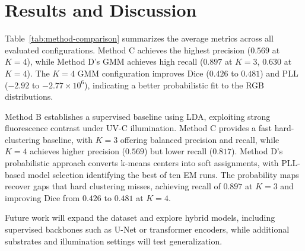 \section{Results and Discussion}

Table~\ref{tab:method-comparison} summarizes the average metrics across all evaluated configurations. Method C achieves the highest precision (\(0.569\) at \(K=4\)), while Method D's GMM achieves high recall (\(0.897\) at \(K=3\), \(0.630\) at \(K=4\)). The \(K=4\) GMM configuration improves Dice (\(0.426\) to \(0.481\)) and PLL (\(-2.92\) to \(-2.77 \times 10^6\)), indicating a better probabilistic fit to the RGB distributions.

\begin{table}[t]
  \centering
  \caption{Cross-method comparison of segmentation metrics.}
  \label{tab:method-comparison}
\end{table}

Method B establishes a supervised baseline using LDA, exploiting strong fluorescence contrast under UV-C illumination. Method C provides a fast hard-clustering baseline, with \(K=3\) offering balanced precision and recall, while \(K=4\) achieves higher precision (\(0.569\)) but lower recall (\(0.817\)). Method D's probabilistic approach converts k-means centers into soft assignments, with PLL-based model selection identifying the best of ten EM runs. The probability maps recover gaps that hard clustering misses, achieving recall of \(0.897\) at \(K=3\) and improving Dice from \(0.426\) to \(0.481\) at \(K=4\).

Future work will expand the dataset and explore hybrid models, including supervised backbones such as U-Net or transformer encoders, while additional substrates and illumination settings will test generalization.

